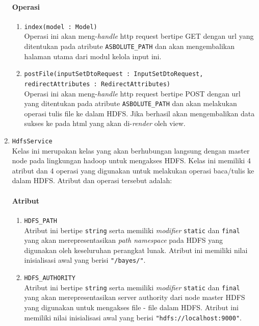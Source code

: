 \begin{enumerate}
\begin{enumerate}
		\end{enumerate}
					
	\paragraph{Operasi}
		\begin{enumerate}
			\item \texttt{index(model : Model)}\\
			Operasi ini akan meng-\textit{handle} http request bertipe GET dengan url yang ditentukan pada atribute \verb|ASBOLUTE_PATH| dan akan mengembalikan halaman utama dari modul kelola input ini.
			
			\item \texttt{postFile(inputSetDtoRequest : InputSetDtoRequest,
      redirectAttributes : RedirectAttributes)}\\
			Operasi ini akan meng-\textit{handle} http request bertipe POST dengan url yang ditentukan pada atribute \verb|ASBOLUTE_PATH| dan akan melakukan operasi tulis file ke dalam HDFS. Jika berhasil akan mengembalikan data sukses ke pada html yang akan di-\textit{render} oleh view.

		\end{enumerate}
		
		

	\item \texttt{HdfsService}\\
	Kelas ini merupakan kelas yang akan berhubungan langsung dengan master node pada lingkungan hadoop untuk mengakses HDFS. Kelas ini memiliki 4 atribut dan 4 operasi yang digunakan untuk melakukan operasi baca/tulis ke dalam HDFS. Atribut dan operasi tersebut adalah:
	\paragraph{Atribut}
		\begin{enumerate}
			\item \verb|HDFS_PATH|\\
			Atribut ini bertipe \texttt{string} serta memiliki \textit{modifier} \texttt{static} dan \texttt{final} yang akan merepresentasikan \textit{path namespace} pada HDFS yang digunakan oleh keseluruhan perangkat lunak. Atribut ini memiliki nilai inisialisasi awal yang berisi \texttt{"/bayes/"}.

			\item \verb|HDFS_AUTHORITY|\\
			Atribut ini bertipe \texttt{string} serta memiliki \textit{modifier} \texttt{static} dan \texttt{final} yang akan merepresentasikan server authority dari node master HDFS yang digunakan untuk mengakses file - file dalam HDFS. Atribut ini memiliki nilai inisialisasi awal yang berisi \texttt{"hdfs://localhost:9000"}.


\end{enumerate}
\end{enumerate}
